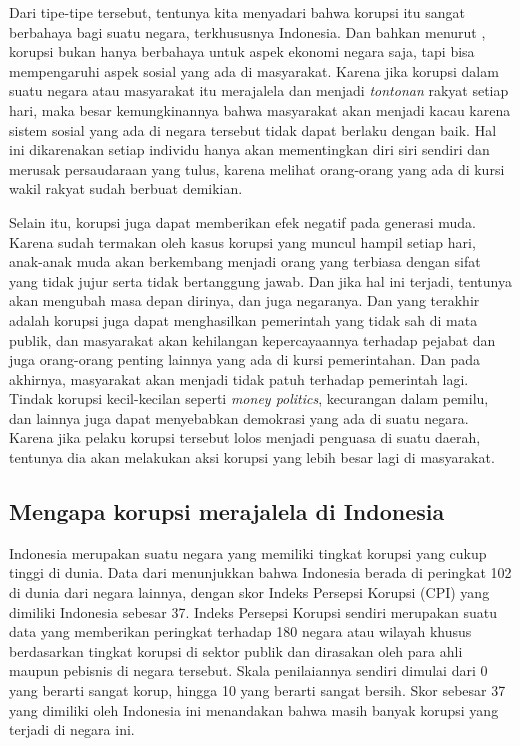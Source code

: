 \documentclass[11pt]{article}
\begin{document}
Dari tipe-tipe tersebut, tentunya kita menyadari bahwa korupsi itu sangat berbahaya
bagi suatu negara, terkhususnya Indonesia. Dan bahkan menurut
\citeauthor*{setiadiKORUPSIDIINDONESIA}, korupsi bukan hanya berbahaya
untuk aspek ekonomi negara saja, tapi bisa mempengaruhi aspek sosial yang ada
di masyarakat. Karena jika korupsi dalam suatu negara atau masyarakat itu merajalela
dan menjadi \emph{tontonan} rakyat setiap hari, maka besar kemungkinannya bahwa
masyarakat akan menjadi kacau karena sistem sosial yang ada di negara tersebut
tidak dapat berlaku dengan baik. Hal ini dikarenakan setiap individu hanya akan
mementingkan diri siri sendiri dan merusak persaudaraan yang tulus, karena melihat 
orang-orang yang ada di kursi wakil rakyat sudah berbuat demikian.

Selain itu, korupsi juga dapat memberikan efek negatif pada generasi muda.
Karena sudah termakan oleh kasus korupsi yang muncul hampil setiap hari,
anak-anak muda akan berkembang menjadi orang yang terbiasa dengan sifat yang tidak jujur serta tidak bertanggung
jawab. Dan jika hal ini terjadi, tentunya akan mengubah masa depan dirinya, dan 
juga negaranya. Dan yang terakhir adalah korupsi juga dapat menghasilkan pemerintah
yang tidak sah di mata publik, dan masyarakat akan kehilangan kepercayaannya terhadap
pejabat dan juga orang-orang penting lainnya yang ada di kursi pemerintahan. Dan
pada akhirnya, masyarakat akan menjadi tidak patuh terhadap pemerintah lagi.
Tindak korupsi kecil-kecilan seperti \emph{money politics}, kecurangan dalam pemilu,
dan lainnya juga dapat menyebabkan demokrasi yang ada di suatu negara. Karena 
jika pelaku korupsi tersebut lolos menjadi penguasa di suatu daerah, tentunya
dia akan melakukan aksi korupsi yang lebih besar lagi di masyarakat.

\subsection{Mengapa korupsi merajalela di Indonesia}
Indonesia merupakan suatu negara yang memiliki tingkat korupsi yang cukup tinggi 
di dunia. Data dari \citeauthor{transparencyinternationalCorruptionPerceptionsIndex2020}
menunjukkan bahwa Indonesia berada di peringkat 102 di dunia dari negara lainnya,
dengan skor Indeks Persepsi Korupsi (CPI) yang dimiliki Indonesia sebesar 37. 
Indeks Persepsi Korupsi sendiri merupakan suatu data yang memberikan peringkat 
terhadap 180 negara atau wilayah khusus berdasarkan tingkat korupsi di sektor publik
dan dirasakan oleh para ahli maupun pebisnis di negara tersebut. Skala penilaiannya
sendiri dimulai dari 0 yang berarti sangat korup, hingga 10 yang berarti sangat
bersih. Skor sebesar 37 yang dimiliki oleh Indonesia ini menandakan bahwa masih
banyak korupsi yang terjadi di negara ini. 
\end{document}
